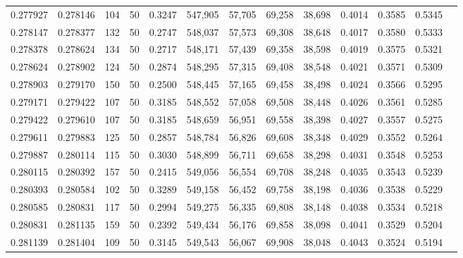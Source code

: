 \begin{tabular}{rrrrrrrrrrrrr}
0.277927 & 0.278146 &   104 &  50 &                                     0.3247 & 547,905 &  57,705 &  69,258 &  38,698 & 0.4014 & 0.3585 & 0.5345 \\
0.278147 & 0.278377 &   132 &  50 &                                     0.2747 & 548,037 &  57,573 &  69,308 &  38,648 & 0.4017 & 0.3580 & 0.5333 \\
0.278378 & 0.278624 &   134 &  50 &                                     0.2717 & 548,171 &  57,439 &  69,358 &  38,598 & 0.4019 & 0.3575 & 0.5321 \\
0.278624 & 0.278902 &   124 &  50 &                                     0.2874 & 548,295 &  57,315 &  69,408 &  38,548 & 0.4021 & 0.3571 & 0.5309 \\
0.278903 & 0.279170 &   150 &  50 &                                     0.2500 & 548,445 &  57,165 &  69,458 &  38,498 & 0.4024 & 0.3566 & 0.5295 \\
0.279171 & 0.279422 &   107 &  50 &                                     0.3185 & 548,552 &  57,058 &  69,508 &  38,448 & 0.4026 & 0.3561 & 0.5285 \\
0.279422 & 0.279610 &   107 &  50 &                                     0.3185 & 548,659 &  56,951 &  69,558 &  38,398 & 0.4027 & 0.3557 & 0.5275 \\
0.279611 & 0.279883 &   125 &  50 &                                     0.2857 & 548,784 &  56,826 &  69,608 &  38,348 & 0.4029 & 0.3552 & 0.5264 \\
0.279887 & 0.280114 &   115 &  50 &                                     0.3030 & 548,899 &  56,711 &  69,658 &  38,298 & 0.4031 & 0.3548 & 0.5253 \\
0.280115 & 0.280392 &   157 &  50 &                                     0.2415 & 549,056 &  56,554 &  69,708 &  38,248 & 0.4035 & 0.3543 & 0.5239 \\
0.280393 & 0.280584 &   102 &  50 &                                     0.3289 & 549,158 &  56,452 &  69,758 &  38,198 & 0.4036 & 0.3538 & 0.5229 \\
0.280585 & 0.280831 &   117 &  50 &                                     0.2994 & 549,275 &  56,335 &  69,808 &  38,148 & 0.4038 & 0.3534 & 0.5218 \\
0.280831 & 0.281135 &   159 &  50 &                                     0.2392 & 549,434 &  56,176 &  69,858 &  38,098 & 0.4041 & 0.3529 & 0.5204 \\
0.281139 & 0.281404 &   109 &  50 &                                     0.3145 & 549,543 &  56,067 &  69,908 &  38,048 & 0.4043 & 0.3524 & 0.5194 \\

\end{tabular}
